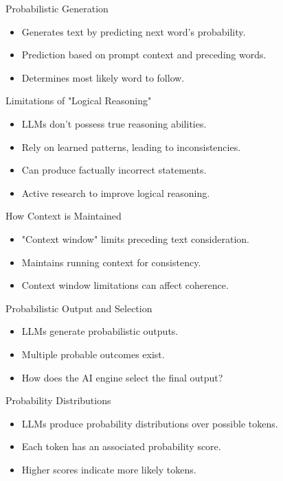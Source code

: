 \documentclass{beamer}
\begin{document}
\begin{frame}{Probabilistic Generation}
  \begin{itemize}
    \item Generates text by predicting next word's probability.
    \item Prediction based on prompt context and preceding words.
    \item Determines most likely word to follow.
  \end{itemize}
\end{frame}

\begin{frame}{Limitations of "Logical Reasoning"}
  \begin{itemize}
    \item LLMs don't possess true reasoning abilities.
    \item Rely on learned patterns, leading to inconsistencies.
    \item Can produce factually incorrect statements.
    \item Active research to improve logical reasoning.
  \end{itemize}
\end{frame}

\begin{frame}{How Context is Maintained}
  \begin{itemize}
    \item "Context window" limits preceding text consideration.
    \item Maintains running context for consistency.
    \item Context window limitations can affect coherence.
  \end{itemize}
\end{frame}

\begin{frame}{Probabilistic Output and Selection}
  \begin{itemize}
    \item LLMs generate probabilistic outputs.
    \item Multiple probable outcomes exist.
    \item How does the AI engine select the final output?
  \end{itemize}
\end{frame}

\begin{frame}{Probability Distributions}
  \begin{itemize}
    \item LLMs produce probability distributions over possible tokens.
    \item Each token has an associated probability score.
    \item Higher scores indicate more likely tokens.
  \end{itemize}
\end{frame}
\end{document}
